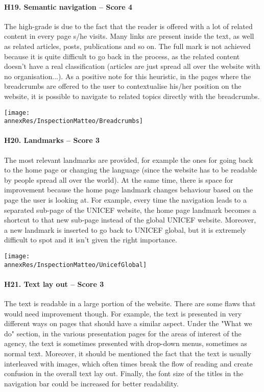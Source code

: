 \paragraph*{H19. Semantic navigation – Score 4}
The high-grade is due to the fact that the reader is offered with a lot of related content in every page s/he visits. Many links are present inside the text, as well as related articles, posts, publications and so on. The full mark is not achieved because it is quite difficult to go back in the process, as the related content doesn't have a real classification (articles are just spread all over the website with no organisation...).
As a positive note for this heuristic, in the pages where the breadcrumbs are offered to the user to contextualise his/her position on the website, it is possible to navigate to related topics directly with the breadcrumbs.\\

\begin{center}
	\texttt{[image: \\annexRes/InspectionMatteo/Breadcrumbs]}
\end{center}


\paragraph*{H20. Landmarks – Score 3}
The most relevant landmarks are provided, for example the ones for going back to the home page or changing the language (since the website has to be readable by people spread all over the world). At the same time, there is space for improvement because the home page landmark changes behaviour based on the page the user is looking at. For example, every time the navigation leads to a separated sub-page of the UNICEF website, the home page landmark becomes a shortcut to that new sub-page instead of the global UNICEF website. Moreover, a new landmark is inserted to go back to UNICEF global, but it is extremely difficult to spot and it isn't given the right importance.

\begin{center}
	\texttt{[image: \\annexRes/InspectionMatteo/UnicefGlobal]}
\end{center}

\paragraph*{H21. Text lay out – Score 3}
The text is readable in a large portion of the website. There are some flaws that would need improvement though. For example, the text is presented in very different ways on pages that should have a similar aspect. Under the "What we do" section, in the various presentation pages for the areas of interest of the agency, the text is sometimes presented with drop-down menus, sometimes as normal text. Moreover, it should be mentioned the fact that the text is usually interleaved with images, which often times break the flow of reading and create confusion in the overall text lay out. 
Finally, the font size of the titles in the navigation bar could be increased for better readability.

